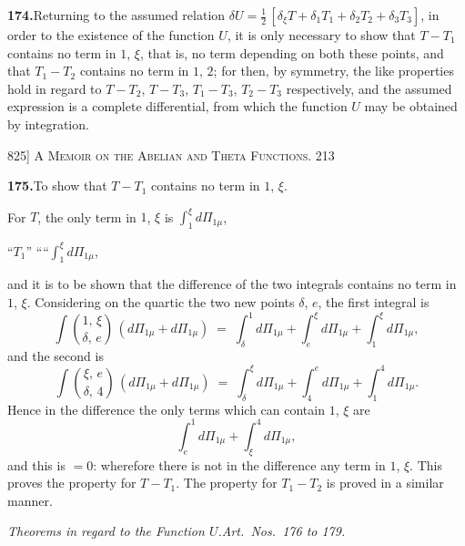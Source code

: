 \documentclass[11pt]{article}
\begin{document}
\medskip
\textbf{174.}\quad Returning to the assumed relation $\delta U = \tfrac{1}{2}\,[\delta_{\xi}T + \delta_{1}T_{1} + \delta_{2}T_{2} + \delta_{3}T_{3}]$, in order
to the existence of the function $U$, it is only necessary to show that $T-T_{1}$ contains
no term in $1$, $\xi$, that is, no term depending on both these points, and that
$T_{1}-T_{2}$ contains no term in $1$, $2$; for then, by symmetry, the like properties hold in
regard to $T-T_{2}$, $T-T_{3}$, $T_{1}-T_{3}$, $T_{2}-T_{3}$ respectively, and the assumed expression is a
complete differential, from which the function $U$ may be obtained by integration.

\newpage
\noindent\textsc{825] \hfill A Memoir on the Abelian and Theta Functions. \hfill 213}
\vspace{0.6em}

\noindent
\textbf{175.}\quad To show that $T-T_{1}$ contains no term in $1$, $\xi$.

For $T$, the only term in $1$, $\xi$ is $\displaystyle\int_{1}^{\xi}d\Pi_{1\mu}$,

\hspace{4em}``\quad $T_{1}$\quad'' \quad ``\quad ``\quad\;\;\;$\displaystyle\int_{1}^{\xi}d\Pi_{1\mu}$,

\noindent and it is to be shown that the difference of the two integrals contains no term in
$1$, $\xi$.  Considering on the quartic the two new points $\delta$, $e$, the first integral is
\[
\int\!\binom{1,\,\xi}{\delta,\,e}\,(d\Pi_{1\mu}+d\Pi_{1\mu}) \;=\; \int_{\delta}^{1}d\Pi_{1\mu}+\int_{e}^{\xi}d\Pi_{1\mu}+\int_{1}^{\xi}d\Pi_{1\mu},
\]
and the second is
\[
\int\!\binom{\xi,\,e}{\delta,\,4}\,(d\Pi_{1\mu}+d\Pi_{1\mu}) \;=\; \int_{\delta}^{\xi}d\Pi_{1\mu}+\int_{4}^{e}d\Pi_{1\mu}+\int_{1}^{4}d\Pi_{1\mu}.
\]
Hence in the difference the only terms which can contain $1$, $\xi$ are
\[
\int_{e}^{1}d\Pi_{1\mu}+\int_{\xi}^{4}d\Pi_{1\mu},
\]
and this is $=0$: wherefore there is not in the difference any term in $1$, $\xi$.
This proves the property for $T-T_{1}$.  The property for $T_{1}-T_{2}$ is proved in a similar manner.

\bigskip
\begin{center}\textit{Theorems in regard to the Function $U$.\quad Art.\ Nos.\ 176 to 179.}\end{center}
\end{document}
